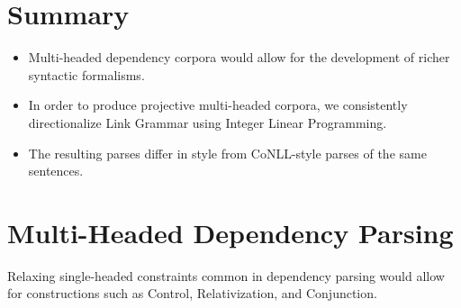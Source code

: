 \documentclass[a0,landscape]{a0poster}
\begin{document}
\begin{multicols}{4} %

\color{Navy} %


\section*{Summary}

\begin{itemize}
\item Multi-headed dependency corpora would allow for the development of richer syntactic formalisms. 
\item In order to produce projective multi-headed corpora, we consistently directionalize Link Grammar using Integer Linear Programming.
\item The resulting parses differ in style from CoNLL-style parses of the same sentences.
\end{itemize}
\color{DarkSlateGray} %

\vspace{-5mm}
\section*{Multi-Headed Dependency Parsing}
Relaxing single-headed constraints common in dependency parsing would allow for constructions such as Control, Relativization, and Conjunction.
%
\vspace{-5mm}

\end{multicols}
\end{document}
